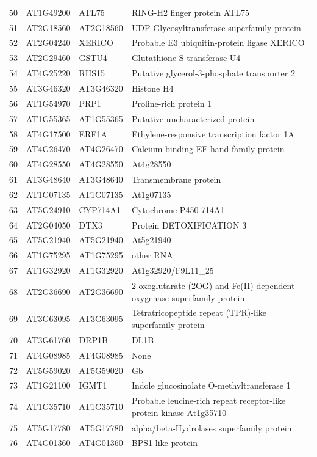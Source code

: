 \documentclass[11pt]{article}
\begin{document}
\begin{center}
\begin{tabular}{rlll}
50 & AT1G49200 & ATL75 & RING-H2 finger protein ATL75\\
51 & AT2G18560 & AT2G18560 & UDP-Glycosyltransferase superfamily protein\\
52 & AT2G04240 & XERICO & Probable E3 ubiquitin-protein ligase XERICO\\
53 & AT2G29460 & GSTU4 & Glutathione S-transferase U4\\
54 & AT4G25220 & RHS15 & Putative glycerol-3-phosphate transporter 2\\
55 & AT3G46320 & AT3G46320 & Histone H4\\
56 & AT1G54970 & PRP1 & Proline-rich protein 1\\
57 & AT1G55365 & AT1G55365 & Putative uncharacterized protein\\
58 & AT4G17500 & ERF1A & Ethylene-responsive transcription factor 1A\\
59 & AT4G26470 & AT4G26470 & Calcium-binding EF-hand family protein\\
60 & AT4G28550 & AT4G28550 & At4g28550\\
61 & AT3G48640 & AT3G48640 & Transmembrane protein\\
62 & AT1G07135 & AT1G07135 & At1g07135\\
63 & AT5G24910 & CYP714A1 & Cytochrome P450 714A1\\
64 & AT2G04050 & DTX3 & Protein DETOXIFICATION 3\\
65 & AT5G21940 & AT5G21940 & At5g21940\\
66 & AT1G75295 & AT1G75295 & other RNA\\
67 & AT1G32920 & AT1G32920 & At1g32920/F9L11\_25\\
68 & AT2G36690 & AT2G36690 & 2-oxoglutarate (2OG) and Fe(II)-dependent oxygenase superfamily protein\\
69 & AT3G63095 & AT3G63095 & Tetratricopeptide repeat (TPR)-like superfamily protein\\
70 & AT3G61760 & DRP1B & DL1B\\
71 & AT4G08985 & AT4G08985 & None\\
72 & AT5G59020 & AT5G59020 & Gb\\
73 & AT1G21100 & IGMT1 & Indole glucosinolate O-methyltransferase 1\\
74 & AT1G35710 & AT1G35710 & Probable leucine-rich repeat receptor-like protein kinase At1g35710\\
75 & AT5G17780 & AT5G17780 & alpha/beta-Hydrolases superfamily protein\\
76 & AT4G01360 & AT4G01360 & BPS1-like protein\\

\end{tabular}
\end{center}
\end{document}
